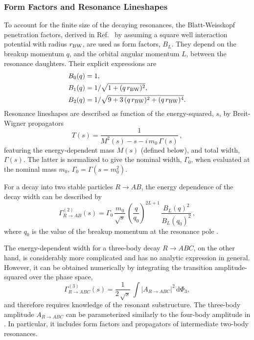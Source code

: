\subsubsection{Form Factors and Resonance Lineshapes}
\label{ssec:lineshapes}

To account for the finite size of the decaying resonances,
the Blatt-Weisskopf penetration factors, 
derived in Ref.~\cite{Bl2}
by assuming a square well interaction potential with radius $r_{\rm BW}$,
are used as form factors, $B_L$.
They depend on
the breakup momentum $q$,
and the orbital angular momentum $L$, between the resonance daughters.
Their explicit expressions are
\begin{align}
         \nonumber
	B_{0}(q)  &= 1 ,  \\ \nonumber
	B_{1}(q)  &= 1 / \sqrt{{1+ (q \, r_{\rm BW})^{2}}} ,  \\
	B_{2}(q)  &= 1 / \sqrt{9+3\,(q \, r_{\rm BW})^{2}+(q \, r_{\rm BW})^{4}} . 
\end{align}
Resonance lineshapes
are described as function of the energy-squared, $s$, by Breit-Wigner propagators
\begin{equation}
	T(s) = \frac{1}
	{M^{2}(s) - s - i\,m_{0}\,\Gamma(s)}   \, ,
	\label{eq:BW}
\end{equation}
featuring the energy-dependent mass $M(s)$ (defined below), and total width, $\Gamma(s)$.
The latter is normalized to give the nominal width, $\Gamma_{0}$, when evaluated at the nominal mass $m_{0}$, 
\ie $\Gamma_{0} = \Gamma(s = m_{0}^{2})$.

For a decay into two stable particles $R \to AB$, the energy dependence of the decay width can be described by 
\begin{equation}
	\Gamma_{R \to AB}^{(2)}(s) = \Gamma_{0} \, \frac{m_{0}}{\sqrt s} \, \left(\frac{q}{q_{0}}\right)^{2L+1} \, \frac{B_{L}(q)^{2}}{B_{L}(q_{0})^{2}}  \, ,
	\label{eq:gamma2}
\end{equation}
where $q_{0}$ is the value of the breakup momentum at the resonance pole \cite{BW}.

The energy-dependent width for a three-body decay $R \to ABC$, on the other hand, is considerably more complicated and has no
analytic expression in general. However, it 
can be obtained numerically by integrating the transition amplitude-squared over the phase space,
\begin{equation}
	\Gamma_{R \to ABC}^{(3)}(s) =  \frac{1}{2 \, \sqrt s} \, \int \vert A_{R \to ABC} \vert^{2} \, \text{d}\Phi_{3}   ,
	\label{eq:gamma3}
\end{equation}
and therefore requires knowledge of the resonant substructure. 
The three-body amplitude $A_{R \to ABC}$ can be parameterized 
similarly to
the four-body amplitude in .
In particular, it includes form factors and propagators of intermediate two-body resonances.


